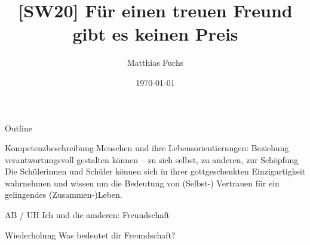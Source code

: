 \documentclass[pdftex,a4paper,12pt,bibliography=totoc,draft]{scrartcl}
\author{Matthias Fuchs}
\date{\today}
\title{[SW20] Für einen treuen Freund gibt es keinen Preis}
\begin{document}
\maketitle
\begin{frame}{Outline}
\tableofcontents
\end{frame}

\begin{frame}[label={sec:orgf12252a}]{Kompetenzbeschreibung}
Menschen und ihre Lebensorientierungen: Beziehung verantwortungsvoll gestalten können – zu sich selbst, zu anderen, zur Schöpfung
Die Schülerinnen und Schüler können sich in ihrer gottgeschenkten Einzigartigkeit wahrnehmen und wissen um die Bedeutung von (Selbst-) Vertrauen für ein gelingendes (Zusammen-)Leben.
\end{frame}

\begin{frame}[label={sec:orgc05fdb9}]{AB / UH}
Ich und die amderen: Freundschaft
\end{frame}

\begin{frame}[label={sec:org0a2dbec}]{Wiederholung}
Was bedeutet dir Freundschaft?
\end{frame}
\end{document}
